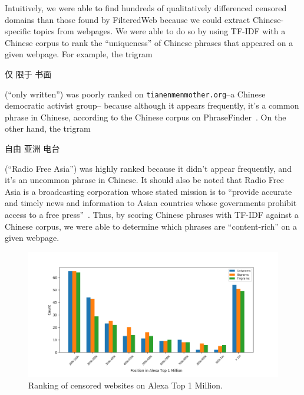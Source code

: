 Intuitively, we were able to find hundreds of qualitatively
differenced censored domains than those found by FilteredWeb because
we could extract Chinese-specific topics from webpages. We were able
to do so by using TF-IDF with a Chinese corpus to rank the
``uniqueness'' of Chinese phrases that appeared on a given
webpage. For example, the trigram
\begin{CJK*}{UTF8}{gbsn}仅 限于 书面\end{CJK*} (``only written'') was poorly ranked on
\texttt{tianenmenmother.org}--a Chinese democratic activist group--
because although it appears frequently, it's a common phrase in
Chinese, according to the Chinese corpus on
PhraseFinder~\cite{phrasefinder}. On the other hand, the
trigram \begin{CJK*}{UTF8}{gbsn}自由 亚洲 电台\end{CJK*} (``Radio Free
Asia'') was highly ranked because it didn't appear frequently, and
it's an uncommon phrase in Chinese. It should also be noted that Radio
Free Asia is a broadcasting corporation whose stated mission is to
``provide accurate and timely news and information to Asian countries
whose governments prohibit access to a free
press''~\cite{rfa:about}. Thus, by scoring Chinese phrases with TF-IDF
against a Chinese corpus, we were able to determine which phrases are
``content-rich'' on a given webpage.

\begin{figure}[htb]
  \centering
  \includegraphics[scale=0.6]{figures/alexa}
  \caption{\label{alexa}Ranking of censored websites on Alexa Top 1 Million.}
\end{figure}

